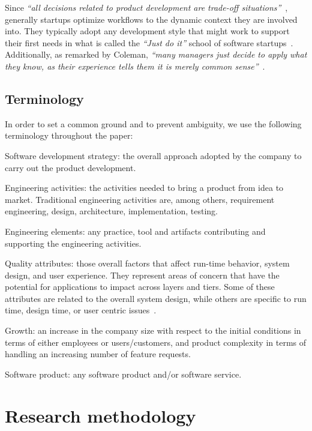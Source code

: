 \documentclass[10pt,journal,letterpaper,compsoc]{IEEEtran}
\begin{document}
Since \textit{``all decisions related to product development are trade-off
situations''}~\cite{Hilmola2003}, generally startups optimize workflows to the
dynamic context they are involved into. They typically adopt any development
style that might work to support their first needs in what is called the
\textit{``Just do it''} school of software startups~\cite{Ries2011}.
Additionally, as remarked by Coleman, \textit{``many managers just decide to
apply what they know, as their experience tells them it is merely common
sense''}~\cite{Coleman2008}.

\subsection{Terminology} In order to set a common ground and to prevent
ambiguity, we use the following terminology throughout the paper:

\begin{compactitem} 
\item Software development strategy: the overall approach adopted by the 
company to carry out the product development. 
\item Engineering activities: the activities needed to bring a product from 
idea to market. Traditional engineering activities are, among others, 
requirement engineering, design, architecture, implementation, testing. 
\item Engineering elements: any practice, tool and artifacts contributing and 
supporting the engineering activities.
\item Quality attributes: those overall factors that affect run-time
behavior, system design, and user experience. They represent areas of concern
that have the potential for applications to impact across layers and tiers.
Some of these attributes are related to the overall system design, while others
are specific to run time, design time, or user centric 
issues~\cite{Microsoft2009}. 
\item Growth: an increase in the company size with respect to the initial 
conditions in terms of either employees or users/customers, and
product complexity in terms of handling an increasing number of feature
requests. 
\item Software product: any software product and/or software service.
\end{compactitem}

\section{Research methodology} \label{resmet}
\end{document}
